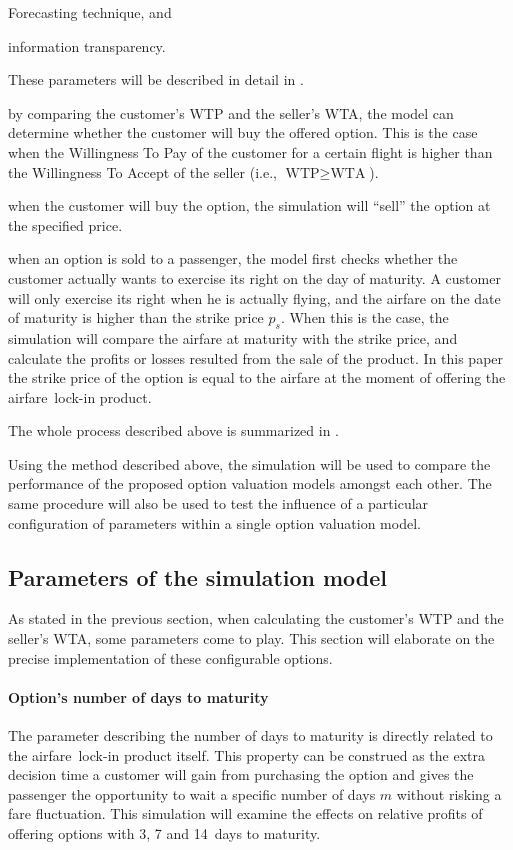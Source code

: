 \begin{description}
\begin{inparaenum}
    \item Forecasting technique, and
    \item information transparency.
    \end{inparaenum} These parameters will be described in detail in .
\item[Compare the WTP with the WTA] by comparing the customer's WTP and the seller's WTA, the model can determine whether the customer will buy the offered option. This is the case when the Willingness To Pay of the customer for a certain flight is higher than the Willingness To Accept of the seller (i.e., $\text{WTP} \ge \text{WTA}$).
\item[Sell the option] when the customer will buy the option, the simulation will ``sell'' the option at the specified price.
\item[Calculate generated profits] when an option is sold to a passenger, the model first checks whether the customer actually wants to exercise its right on the day of maturity. A customer will only exercise its right when he is actually flying, and the airfare on the date of maturity is higher than the strike price $p_s$. When this is the case, the simulation will compare the airfare at maturity with the strike price, and calculate the profits or losses resulted from the sale of the product. In this paper the strike price of the option is equal to the airfare at the moment of offering the airfare~lock-in product.
\end{description}

The whole process described above is summarized in .


Using the method described above, the simulation will be used to compare the performance of the proposed option valuation models amongst each other. The same procedure will also be used to test the influence of a particular configuration of parameters within a single option valuation model.

\subsection{Parameters of the simulation model}
As stated in the previous section, when calculating the customer's WTP and the seller's WTA, some parameters come to play. This section will elaborate on the precise implementation of these configurable options.


\paragraph{Option's number of days to maturity}
The parameter describing the number of days to maturity is directly related to the airfare~lock-in product itself. This property can be construed as the extra decision time a customer will gain from purchasing the option and gives the passenger the opportunity to wait a specific number of days $m$ without risking a fare fluctuation. This simulation will examine the effects on relative profits of offering options with 3, 7 and 14~days to maturity.

